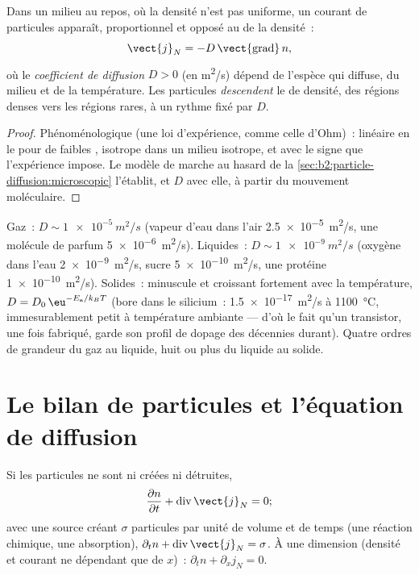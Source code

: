 \begin{theorem}\label{thm:b2:particle-diffusion:fick}
Dans un milieu au repos, où la densité n'est pas uniforme, un courant de
particules apparaît, proportionnel et opposé au  de la
densité~:
\[
\vect{j}_N = -D\,\vect{\operatorname{grad}}\,n ,
\]
où le \emph{coefficient de diffusion}
$D > 0$ (en \unit{m^2/s}) dépend de l'espèce qui diffuse, du
milieu et de la température. Les particules \emph{descendent} le  de
densité, des régions denses vers les régions rares, à un rythme fixé par $D$.
\end{theorem}

\begin{proof}
Phénoménologique (une loi d'expérience, comme celle d'Ohm)~: linéaire en le
 pour de faibles , isotrope dans un milieu isotrope, et
avec le signe que l'expérience impose. Le modèle de marche au hasard de la
\cref{sec:b2:particle-diffusion:microscopic} l'établit, et $D$ avec elle,
à partir du mouvement moléculaire.
\end{proof}

\begin{example}\label{ex:b2:particle-diffusion:orders}
Gaz~: $D \sim \qty{1e-5}{m^2/s}$ (vapeur d'eau dans l'air
\qty{2.5e-5}{m^2/s}, une molécule de parfum \qty{5e-6}{m^2/s}). Liquides~:
$D \sim \qty{1e-9}{m^2/s}$ (oxygène dans l'eau \qty{2e-9}{m^2/s}, sucre
\qty{5e-10}{m^2/s}, une protéine \qty{1e-10}{m^2/s}). Solides~: minuscule et
croissant fortement avec la température, $D = D_0\,\eu^{-E_{\text{a}}/k_BT}$
(bore dans le silicium~: \qty{1.5e-17}{m^2/s} à \qty{1100}{\celsius},
immesurablement petit à température ambiante --- d'où le fait qu'un transistor,
une fois fabriqué, garde son profil de dopage des décennies durant). Quatre ordres de
grandeur du gaz au liquide, huit ou plus du liquide au solide.
\end{example}

\section{Le bilan de particules et l'équation de diffusion}

\begin{theorem}\label{thm:b2:particle-diffusion:balance}
Si les particules ne sont ni créées ni détruites,
\[
\frac{\partial n}{\partial t} + \operatorname{div}\vect{j}_N = 0 ;
\]
avec une source créant $\sigma$ particules par unité de volume et de temps
(une réaction chimique, une absorption), $\partial_t n +
\operatorname{div}\vect{j}_N = \sigma$. À une dimension (densité et
courant ne dépendant que de $x$)~: $\partial_t n + \partial_x j_N = 0$.
\end{theorem}

